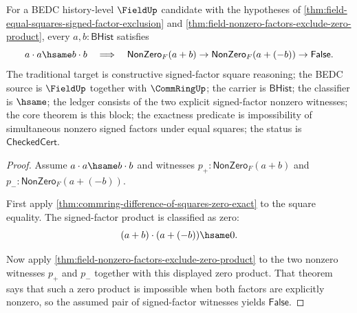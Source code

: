 \begin{theorem}
\label{thm:field-equal-squares-signed-factors-not-both-nonzero}
For a BEDC history-level $\FieldUp$ candidate with the hypotheses of
\autoref{thm:field-equal-squares-signed-factor-exclusion} and
\autoref{thm:field-nonzero-factors-exclude-zero-product}, every
$a,b:\mathsf{BHist}$ satisfies
$$
a\cdot a\hsame b\cdot b
\quad\Longrightarrow\quad
\mathsf{NonZero}_F(a+b)\to
\mathsf{NonZero}_F(a+(-b))\to\mathsf{False}.
$$
The traditional target is constructive signed-factor square reasoning; the
BEDC source is $\FieldUp$ together with $\CommRingUp$; the carrier is
$\mathsf{BHist}$; the classifier is $\hsame$; the ledger consists of the two
explicit signed-factor nonzero witnesses; the core theorem is this block; the
exactness predicate is impossibility of simultaneous nonzero signed factors
under equal squares; the status is $\mathsf{CheckedCert}$.
\end{theorem}
\begin{proof}
Assume $a\cdot a\hsame b\cdot b$ and witnesses
$p_+:\mathsf{NonZero}_F(a+b)$ and
$p_-:\mathsf{NonZero}_F(a+(-b))$.

First apply \autoref{thm:commring-difference-of-squares-zero-exact} to the
square equality. The signed-factor product is classified as zero:
$$
(a+b)\cdot(a+(-b))\hsame0.
$$

Now apply \autoref{thm:field-nonzero-factors-exclude-zero-product} to the two
nonzero witnesses $p_+$ and $p_-$ together with this displayed zero product.
That theorem says that such a zero product is impossible when both factors are
explicitly nonzero, so the assumed pair of signed-factor witnesses yields
$\mathsf{False}$.
\end{proof}

